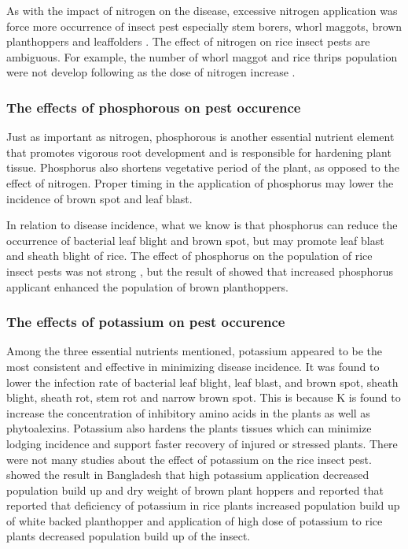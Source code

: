 \documentclass[12pt, oneside]{report}
\begin{document}
As with the impact of nitrogen on the disease, excessive nitrogen application was force more occurrence of insect pest especially stem borers, whorl maggots, brown planthoppers and leaffolders \citep{chau2003impacts, litsinger2011cultural, rashid2014effect}. The effect of nitrogen on rice insect pests are ambiguous. For example, the number of whorl maggot and rice thrips population were not develop following as the dose of nitrogen increase \cite{chau2003impacts}.

\subsubsection{The effects of phosphorous on pest occurence}

Just as important as nitrogen, phosphorous is another essential nutrient element that promotes vigorous root development and is responsible for hardening plant tissue. Phosphorus also shortens vegetative period of the plant, as opposed to the effect of nitrogen. Proper timing in the application of phosphorus may lower the incidence of brown spot and leaf blast. 

In relation to disease incidence, what we know is that phosphorus can reduce the occurrence of bacterial leaf blight and brown spot, but may promote leaf blast and sheath blight of rice. The effect of phosphorus on the population of rice insect pests was not strong \citep{chau2003impacts, rashid2014effect}, but the result of \cite{rashid2014effect} showed that increased phosphorus applicant enhanced the population of brown planthoppers.

\subsubsection{The effects of potassium on pest occurence}

Among the three essential nutrients mentioned, potassium appeared to be the most consistent and effective in minimizing disease incidence. It was found to lower the infection rate of bacterial leaf blight, leaf blast, and brown spot, sheath blight, sheath rot, stem rot and narrow brown spot. This is because K is found to increase the concentration of inhibitory amino acids in the plants as well as phytoalexins. Potassium also hardens the plants tissues which can minimize lodging incidence and support faster recovery of injured or stressed plants. There were not many studies about the effect of potassium on the rice insect pest. \cite{rashid2014effect} showed the result in Bangladesh that high potassium application decreased population build up and dry weight of brown plant hoppers and \cite{salim2002effects} reported that reported that deficiency of potassium in rice plants increased population build up of white backed planthopper and application of high dose of potassium to rice plants decreased population build up of the insect.
\end{document}
